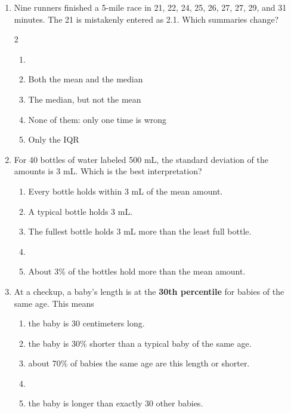 \documentclass[12pt]{article}
\newenvironment{choices}
  {\begin{enumerate}[label=\textbf{(\Alph*)}, leftmargin=2.2em, itemsep=0pt, topsep=1pt]}
  {\end{enumerate}}
\newcommand{\letterroom}{\rule[-15pt]{0pt}{36pt}}
\begin{document}
\begin{enumerate}[leftmargin=1.9em, itemsep=0.03in]
  \boxguard[10]
  \item Nine runners finished a 5-mile race in 21, 22, 24, 25, 26, 27, 27, 29, and 31 minutes. The
        21 is mistakenly entered as 2.1. Which summaries change?
        \begin{multicols}{2}
        \begin{choices}
          \item {}
          \item Both the mean and the median
          \item The median, but not the mean
          \item None of them: only one time is wrong
          \item Only the IQR
                \hfill{}\letterroom
        \end{choices}
        \end{multicols}

  \boxguard[10]
  \item For 40 bottles of water labeled 500 mL, the standard deviation of the amounts is 3 mL.
        Which is the best interpretation?
        \begin{choices}
          \item Every bottle holds within 3 mL of the mean amount.
          \item A typical bottle holds 3 mL.
          \item The fullest bottle holds 3 mL more than the least full bottle.
          \item {}
          \item About 3\% of the bottles hold more than the mean amount.
                \hfill{}\letterroom
        \end{choices}

  \boxguard[10]
  \item At a checkup, a baby's length is at the \textbf{30th percentile} for babies of the same
        age. This means
        \begin{choices}
          \item the baby is 30 centimeters long.
          \item the baby is 30\% shorter than a typical baby of the same age.
          \item about 70\% of babies the same age are this length or shorter.
          \item {}
          \item the baby is longer than exactly 30 other babies.
                \hfill{}\letterroom
        \end{choices}


\end{enumerate}
\end{document}
